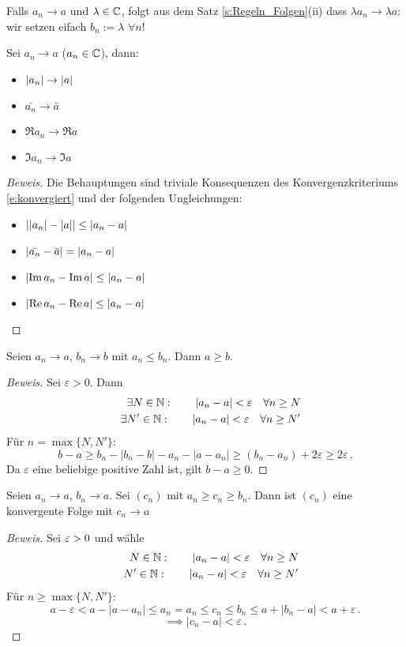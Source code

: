 \begin{Bem} Falls $a_n\to a$ und $\lambda\in \mathbb{C}$, folgt aus dem Satz \ref{s:Regeln_Folgen}(ii)
dass $\lambda a_n \to \lambda a$: wir setzen eifach $b_n := \lambda$ $\forall n$!
\end{Bem}


\begin{Sat}
  Sei $a_n\to a$ ($a_n\in\mathbb{C}$), dann:
  \begin{itemize}
    \item $\mathopen| a_n \mathclose|\to\mathopen| a \mathclose|$
    \item $\bar{a_n}\to\bar{a}$
    \item $\Re a_n\to\Re a$
    \item $\Im a_n\to\Im a$
  \end{itemize}
\end{Sat}
\begin{proof}[Beweis] Die Behauptungen sind triviale Konsequenzen des
Konvergenzkriteriums \eqref{e:konvergiert} und der folgenden Ungleichungen:
  \begin{itemize}
    \item $\mathopen| \mathopen| a_n \mathclose|-\mathopen| a \mathclose| \mathclose|\leq \mathopen| a_n-a \mathclose|$
    \item $\mathopen| \bar{a_n}-\bar{a} \mathclose|= \mathopen| a_n-a \mathclose|$
    \item $\mathopen| \operatorname{Im} a_n-\operatorname{Im} a \mathclose|\leq \mathopen| a_n-a \mathclose|$
    \item $\mathopen| \operatorname{Re} a_n-\operatorname{Re} a \mathclose|\leq \mathopen| a_n-a \mathclose|$
  \end{itemize}
\end{proof}
\begin{Sat}
  Seien $a_n\to a$, $b_n\to b$ mit $a_n\leq b_n$. Dann $a\geq b$.
\end{Sat}
\begin{proof}[Beweis] Sei $\varepsilon>0$. Dann
\begin{eqnarray*}
&&\exists N\in \mathbb{N}: \qquad |a_n-a|< \varepsilon \quad \forall n\geq N\\
&&\exists N'\in \mathbb{N}: \qquad |a_n-a|< \varepsilon \quad \forall n\geq N'
\end{eqnarray*}
F\"ur $n=\max \{N, N'\}$:
$$
b-a\geq b_n - |b_n-b| - a_n - |a-a_n| \geq (b_n-a_n) + 2\varepsilon \geq 2\varepsilon\, . 
$$
Da $\varepsilon$ eine beliebige positive Zahl ist, gilt $b-a\geq 0$. 
\end{proof}

\begin{Sat}
  Seien $a_n\to a$, $b_n\to a$. Sei $(c_n)$ mit $a_n\geq c_n\geq b_n$. 
Dann ist $(c_n)$ eine konvergente Folge mit $c_n\to a$
\end{Sat}
\begin{proof}[Beweis]
Sei $\varepsilon>0$ und w\"ahle
\begin{eqnarray*}
&& N\in \mathbb{N}: \qquad |a_n-a|< \varepsilon \quad \forall n\geq N\\
&& N'\in \mathbb{N}: \qquad |a_n-a|< \varepsilon \quad \forall n\geq N'
\end{eqnarray*}
F\"ur $n\geq \max \{N, N'\}$:
$$
a- \varepsilon < a - |a -a_n| \leq a_n = a_n \leq c_n
\leq b_n \leq a + |b_n-a| < a+\varepsilon\, .
$$
$$
\implies |c_n-a|<\varepsilon\, .
$$
\end{proof}

